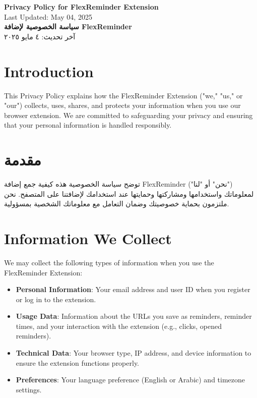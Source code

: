 \documentclass[12pt]{article}
\begin{document}
\begin{center}
    {\LARGE\bfseries Privacy Policy for FlexReminder Extension}\\[\baselineskip]
    {\large Last Updated: May 04, 2025}\\[\baselineskip]
    {\large\bfseries سياسة الخصوصية لإضافة FlexReminder}\\[\baselineskip]
    {\large آخر تحديث: ٤ مايو ٢٠٢٥}
\end{center}

\section{Introduction}
This Privacy Policy explains how the FlexReminder Extension ("we," "us," or "our") collects, uses, shares, and protects your information when you use our browser extension. We are committed to safeguarding your privacy and ensuring that your personal information is handled responsibly.

\section*{\textarabic{مقدمة}}
\textarabic{توضح سياسة الخصوصية هذه كيفية جمع إضافة FlexReminder ("نحن" أو "لنا") لمعلوماتك واستخدامها ومشاركتها وحمايتها عند استخدامك لإضافتنا على المتصفح. نحن ملتزمون بحماية خصوصيتك وضمان التعامل مع معلوماتك الشخصية بمسؤولية.}

\section{Information We Collect}
We may collect the following types of information when you use the FlexReminder Extension:
\begin{itemize}
    \item \textbf{Personal Information}: Your email address and user ID when you register or log in to the extension.
    \item \textbf{Usage Data}: Information about the URLs you save as reminders, reminder times, and your interaction with the extension (e.g., clicks, opened reminders).
    \item \textbf{Technical Data}: Your browser type, IP address, and device information to ensure the extension functions properly.
    \item \textbf{Preferences}: Your language preference (English or Arabic) and timezone settings.
\end{itemize}
\end{document}
